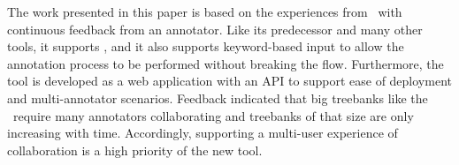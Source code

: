The work presented in this paper is based on the experiences from \boatvone\ with continuous feedback from an annotator.
Like its predecessor and many other tools, it supports \ud, and it also supports keyword-based input to allow the annotation process to be performed without breaking the flow.
Furthermore, the tool is developed as a web application with an API to support ease of deployment and multi-annotator scenarios.
Feedback indicated that big treebanks like the \bountreebank\ require many annotators collaborating and treebanks of that size are only increasing with time.
Accordingly, supporting a multi-user experience of collaboration is a high priority of the new tool.
